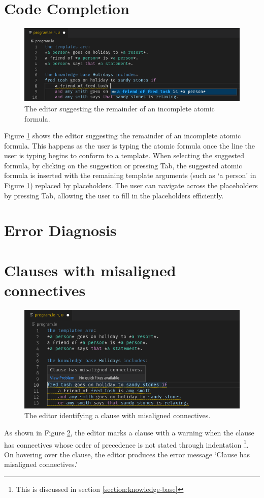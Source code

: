 \documentclass[../main.tex]{subfiles}
\begin{document}
\section{Code Completion}\begin{figure}[h!]
\centering
\includegraphics[width = \linewidth]{./figures/autocomplete.png}
\caption{The editor suggesting the remainder of an incomplete atomic formula.}
\label{fig:code-completion}
\end{figure}
Figure \ref{fig:code-completion} shows the editor suggesting the remainder of an incomplete atomic formula. This happens as the user is typing the atomic formula once the line the user is typing begins to conform to a template. When selecting the suggested formula, by clicking on the suggestion or pressing Tab, the suggested atomic formula is inserted with the remaining template arguments (such as `a person' in Figure \ref{fig:code-completion}) replaced by placeholders. The user can navigate across the placeholders by pressing Tab, allowing the user to fill in the placeholders efficiently.

\section{Error Diagnosis}
\section{Clauses with misaligned connectives}
\begin{figure}[h!]
\centering
\includegraphics[width = \linewidth]{./figures/clause-misaligned-connectives.png}
\caption{The editor identifying a clause with misaligned connectives.}
\label{fig:misaligned-connectives}
\end{figure}
As shown in Figure  \ref{fig:misaligned-connectives}, the editor marks a clause with a warning when the clause has connectives whose order of precedence is not stated through indentation \footnote{This is discussed in section \ref{section:knowledge-base}}. On hovering over the clause, the editor produces the error message `Clause has misaligned connectives.'
\end{document}

